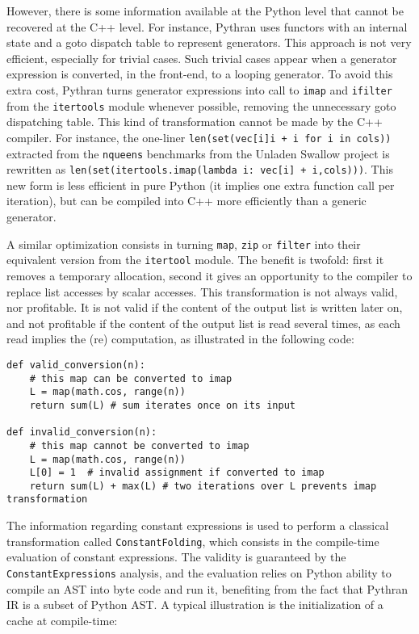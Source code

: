 \documentclass[10pt, onecolumn, preprint]{sigplanconf}
\begin{document}
However, there is some information available at the Python level that cannot
be recovered at the C++ level. For instance, Pythran uses functors with an
internal state and a goto dispatch table to represent generators. This approach
is not very efficient, especially for trivial cases.
Such trivial cases appear when a generator expression is converted, in the
front-end, to a looping generator. To avoid this extra cost, Pythran turns
generator expressions into call to \texttt{imap} and \texttt{ifilter} from the
\texttt{itertools} module whenever possible, removing the unnecessary goto
dispatching table. This kind of transformation cannot be made by the C++
compiler. For instance, the one-liner \texttt{len(set(vec[i]i + i for i in cols))}
extracted from the \texttt{nqueens} benchmarks from the Unladen Swallow project
is rewritten as \texttt{len(set(itertools.imap(lambda i: vec[i] + i,cols)))}.
This new form is less efficient in pure Python (it implies one extra function
call per iteration), but can be compiled into C++ more efficiently than a
generic generator.

A similar optimization consists in turning \texttt{map}, \texttt{zip} or
\texttt{filter} into their equivalent version from the \texttt{itertool}
module. The benefit is twofold: first it removes a temporary allocation, second
it gives an opportunity to the compiler to replace list accesses by scalar
accesses. This transformation is not always valid, nor profitable. It is not
valid if the content of the output list is written later on, and not profitable
if the content of the output list is read several times, as each read implies
the (re) computation, as illustrated in the following code:

\begin{lstlisting}
def valid_conversion(n):
    # this map can be converted to imap
    L = map(math.cos, range(n))
    return sum(L) # sum iterates once on its input

def invalid_conversion(n):
    # this map cannot be converted to imap
    L = map(math.cos, range(n))
    L[0] = 1  # invalid assignment if converted to imap
    return sum(L) + max(L) # two iterations over L prevents imap transformation
\end{lstlisting}

The information regarding constant expressions is used to perform a classical
transformation called \texttt{ConstantFolding}, which consists in the compile-time
evaluation of constant expressions. The validity is guaranteed by the
\texttt{ConstantExpressions} analysis, and the evaluation relies on Python ability to
compile an AST into byte code and run it, benefiting from the fact that Pythran
IR is a subset of Python AST. A typical illustration is the initialization of a
cache at compile-time:
\end{document}
